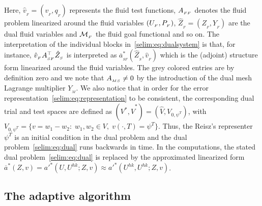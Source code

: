 Here, $\hat{v}_{_{F}} = (v_{_{F}}, q_{_{F}})$ represents the fluid
test functions, $A_{_{FF}}$ denotes the fluid problem linearized around the
fluid variables $(U_{_{F}},P_{_{F}})$, $\hat{Z}_{_{F}} = (Z_{_{F}}, Y_{_{F}})$
are the dual fluid variables and $\mathcal{M}_{_{F}}$ the fluid goal functional
and so on. The interpretation of the individual blocks
in~\eqref{selim:eq:dualsystem} is that, for instance,
$\hat{v}_{_{F}}A_{_{SF}}^{\top}\hat{Z}_{_{S}} $ is interpreted as 
$\overline{a}^*_{_{SF}}(\hat{Z}_{_{S}}, \hat{v}_{_{F}})$ which is the
(adjoint) structure form linearized around the fluid variables.  The
grey colored entries are by definition zero and we note that $A_{_{MS}}
\neq 0$ by the introduction of the dual mesh Lagrange multiplier
$Y_{_{M}}$. We also notice that in order for the error
representation~\eqref{selim:eq:representation} to be consistent, the
corresponding dual trial and test spaces are defined as $(V^*,
\hat{V}^*) = (\hat{V}, V_{0, \psi^T})$, with $V_{0,\psi^T} =
\{v=w_1-w_2:\;w_1,w_2\in V , \;v(\cdot, T) = \psi^T \}$. Thus, the
Reisz's representer $\psi^T$ is an initial condition in the dual
problem and the dual problem~\eqref{selim:eq:dual} runs backwards in
time.  In the computations, the stated dual
problem~\eqref{selim:eq:dual} is replaced by the approximated
linearized form $\overline{a}^{*}(Z, v) = a'^{*}(U,U^{hk}; Z, v)
\approx a'^{*}(U^{hk}, U^{hk}; Z, v) $.

\subsection{The adaptive algorithm}

